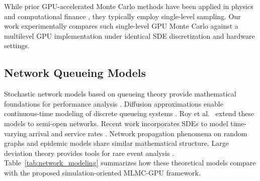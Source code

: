 \documentclass[pdflatex,sn-mathphys-num]{sn-jnl}
\theoremstyle{thmstyleone}%
\theoremstyle{thmstyletwo}%
\theoremstyle{thmstylethree}%
\begin{document}
\begin{sloppypar}
While prior GPU-accelerated Monte Carlo methods have been applied in physics and computational
finance \cite{nvidia2020cuda,owens2008,harris2007,thompson2010gpu}, they typically employ
single-level sampling. Our work experimentally compares such single-level GPU Monte Carlo against
a multilevel GPU implementation under identical SDE discretization and hardware settings.
\end{sloppypar}

\subsection{Network Queueing Models}

Stochastic network models based on queueing theory provide mathematical foundations for
performance analysis \cite{kelly2011stochastic,whitt2002}. Diffusion approximations enable
continuous-time modeling of discrete queueing systems \cite{kang2007,harrison1985}. Roy et al.\
\cite{roy2016} extend these models to semi-open networks. Recent work incorporates SDEs to model
time-varying arrival and service rates \cite{mandelbaum2014stochastic}. Network propagation
phenomena on random graphs \cite{hofstad2016} and epidemic models \cite{kenah2011} share similar
mathematical structure. Large deviation theory provides tools for rare event analysis
\cite{chatterjee2017}. Table~\ref{tab:network_modeling} summarizes how these theoretical models
compare with the proposed simulation-oriented MLMC-GPU framework.

\begin{landscape}
\centering
{}%
\label{tab:network_modeling}
\end{landscape}
\end{document}

